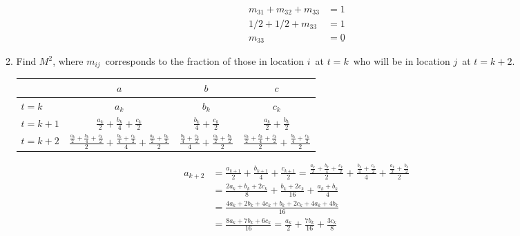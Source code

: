 \documentclass{letter}
\newcommand{\?}{\stackrel{?}{=}}
\newcommand\Que[1]{%
   \leavevmode\noindent
   #1
}
\newcommand\Ans[2][]{%
   \leavevmode\noindent
   {
       \begin{mdframed}[backgroundcolor=blue!10]
       #2
       \end{mdframed}
   }
}
\begin{document}
\begin{enumerate}
\begin{enumerate}[label=(\alph*)]
{\begin{minipage}[m]{0.4\textwidth}
      \begin{align*}
      m_{31}+m_{32}+m_{33}&=1 \\
      1/2 + 1/2 + m_{33}&=1   \\
      m_{33} &= \underline{0}
      \end{align*}
      \end{minipage}
    }
    \newpage
    \item \Que{
        Find $M^2$, where $m_{ij}$\ corresponds to the fraction of those in location $i$\ at $t=k$\ who will be in location $j$\ at $t=k+2$.  
    }
    \Ans{
     \begin{center}
          \begin{tabular}{| l || c | c | c |} 
            \hline
            & $a$ & $b$ & $c$ \\ [0.5ex] 
            \hline\hline
            $t=k$ & $a_k$ & $b_k$ & $c_k$ \\ [0.5ex]
            \hline
            $t=k+1$ & $\frac{a_k}{2}+\frac{b_k}{4}+\frac{c_k}{2}$ & 
                      $\frac{b_k}{4}+\frac{c_k}{2}$ & $\frac{a_k}{2}+\frac{b_k}{2}$ \\ [0.5ex]
            \hline
            $t=k+2$ & $\frac{\frac{a_k}{2}+\frac{b_k}{4}+\frac{c_k}{2}}{2} + 
                       \frac{\frac{b_k}{4}+\frac{c_k}{2}}{4} +
                       \frac{\frac{a_k}{2}+\frac{b_k}{2}}{2}$ & 
                      $\frac{\frac{b_k}{4}+\frac{c_k}{2}}{4} + 
                       \frac{\frac{a_k}{2}+\frac{b_k}{2}}{2}$ & 
                      $\frac{\frac{a_k}{2}+\frac{b_k}{4}+\frac{c_k}{2}}{2} + 
                       \frac{\frac{b_k}{4}+\frac{c_k}{2}}{2}$ \\ [0.5ex]
            \hline
          \end{tabular}
        \end{center}
        \begin{align*}
        a_{k+2}  &= \frac{a_{k+1}}{2}+\frac{b_{k+1}}{4}+\frac{c_{k+1}}{2} 
                  = \frac{\frac{a_k}{2}+\frac{b_k}{4}+\frac{c_k}{2}}{2} + 
                       \frac{\frac{b_k}{4}+\frac{c_k}{2}}{4} +
                       \frac{\frac{a_k}{2}+\frac{b_k}{2}}{2} \\
                 &= \frac{2a_k+b_k+2c_k}{8}+\frac{b_k+2c_k}{16}+\frac{a_k+b_k}{4} \\
                 &= \frac{4a_k+2b_k+4c_k+b_k+2c_k+4a_k+4b_k}{16} \\
                 &= \frac{8a_k+7b_k+6c_k}{16} 
                 = \frac{a_k}{2} + \frac{7b_k}{16} + \frac{3c_k}{8} \\

\end{align*}}
\end{enumerate}
\end{enumerate}
\end{document}
